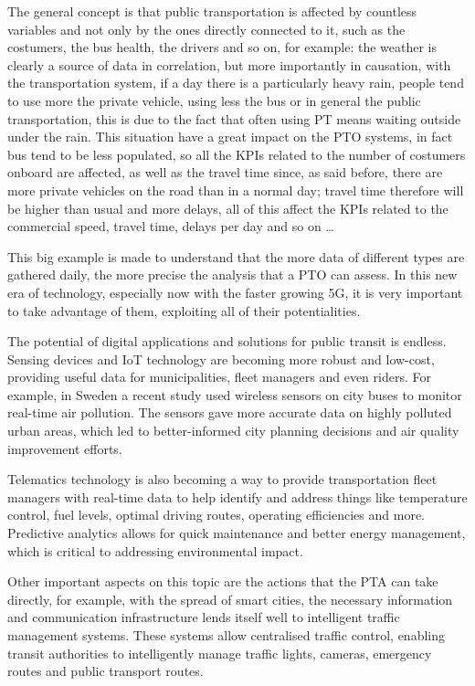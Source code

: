 The general concept is that public transportation is affected by countless variables and not only by the ones directly connected to it, such as the costumers, the bus health, the drivers and so on, for example: the weather is clearly a source of data in correlation, but more importantly in causation, with the transportation system, if a day there is a particularly heavy rain, people tend to use more the private vehicle, using less the bus or in general the public transportation, this is due to the fact that often using PT means waiting outside under the rain. This situation have a great impact on the PTO systems, in fact bus tend to be less populated, so all the KPIs related to the number of costumers onboard are affected, as well as the travel time since, as said before, there are more private vehicles on the road than in a normal day; travel time therefore will be higher than usual and more delays, all of this affect the KPIs related to the commercial speed, travel time, delays per day and so on \dots

This big example is made to understand that the more data of different types are gathered daily, the more precise the analysis that a PTO can assess. In this new era of technology, especially now with the faster growing 5G, it is very important to take advantage of them, exploiting all of their potentialities.

The potential of digital applications and solutions for public transit is endless. Sensing devices and IoT technology are becoming more robust and low-cost, providing useful data for municipalities, fleet managers and even riders. For example, in Sweden a recent study used wireless sensors on city buses to monitor real-time air pollution. The sensors gave more accurate data on highly polluted urban areas, which led to better-informed city planning decisions and air quality improvement efforts. 

Telematics technology is also becoming a way to provide transportation fleet managers with real-time data to help identify and address things like temperature control, fuel levels, optimal driving routes, operating efficiencies and more. Predictive analytics allows for quick maintenance and better energy management, which is critical to addressing environmental impact.

Other important aspects on this topic are the actions that the PTA can take directly, for example, with the spread of smart cities, the necessary information and communication infrastructure lends itself well to intelligent traffic management systems. These systems allow centralised traffic control, enabling transit authorities to intelligently manage traffic lights, cameras, emergency routes and public transport routes.

